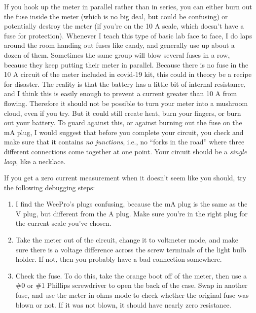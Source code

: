 If you hook up the meter in parallel rather than in series, you can
either burn out the fuse inside the meter (which is no big deal, but
could be confusing) or potentially destroy the meter (if you're on the
10 A scale, which doesn't have a fuse for protection). Whenever I
teach this type of basic lab face to face, I do laps around the room handing out fuses
like candy, and generally use up about a dozen of them. Sometimes the
same group will blow several fuses in a row, because they keep putting
their meter in parallel. Because there is no fuse in the 10 A circuit
of the meter included in covid-19 kit, this could in theory be a
recipe for disaster. The reality is that the battery has a little bit
of internal resistance, and I think this is easily enough to prevent a
current greater than 10 A from flowing. Therefore it should not be possible
to turn your meter into a mushroom cloud, even if you try. But it could
still create heat, burn your fingers, or burn out your battery. To guard
against this, or against burning out the fuse on the mA plug, I would suggest
that before you complete your circuit, you check and make sure that it
contains \emph{no junctions}, i.e., no ``forks in the road'' where three different
connections come together at one point. Your circuit should be a \emph{single loop},
like a necklace.

If you get a zero current measurement when it doesn't seem like you
should, try the following debugging steps:

\begin{enumerate}
\item I find the WeePro's plugs confusing, because the mA plug is the same
as the V plug, but different from the A plug. Make sure you're in the right
plug for the current scale you've chosen.

\item Take the meter out of the circuit, change it to voltmeter mode, and
make sure there is a voltage difference across the screw terminals of the light bulb holder. If not,
then you probably have a bad connection somewhere.

\item Check the fuse. To do this, take the orange boot off of the meter, then use a \#0 or \#1 Phillips
screwdriver to open the back of the case. Swap in another fuse, and use the meter in ohms mode to check
whether the original fuse was blown or not. If it was not blown, it should have nearly zero resistance.
\end{enumerate}


